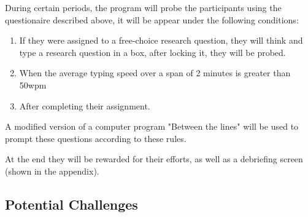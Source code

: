 \documentclass{article}
\begin{document}



During certain periods, the program will probe the participants using the questionaire described above, it will be appear under the following conditions:
\begin{enumerate}
    \item If they were assigned to a free-choice research question, they will think and type a research question in a box, after locking it, they will be probed.
    \item When the average typing speed over a span of 2 minutes is greater than 50wpm
    \item After completing their assignment.
\end{enumerate} 

A modified version of a computer program "Between the lines" \parencite{Ainley2002} will be used to prompt these questions according to these rules.

At the end they will be rewarded for their efforts, as well as a debriefing screen (shown in the appendix).










\subsection{Potential Challenges}
\end{document}
